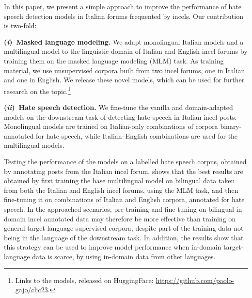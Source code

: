 \documentclass[11pt]{article}
\newcommand{\Ni}{({\em i})~}
\newcommand{\Nii}{({\em ii})~}
\newcommand{\todoA}[1]{\todo[color=blue!40]{A: #1}}
\begin{document}
In this paper, we present a simple approach to improve the performance of hate speech detection models in Italian forums frequented by incels. Our contribution is two-fold:


\noindent\textbf{\Ni Masked language modeling.} We adapt monolingual Italian models and a multilingual model to the linguistic domain of Italian and English incel forums by training them on the masked language modeling (MLM) task.
As training material, we use unsupervised corpora built from two incel forums, one in Italian and one in English.
We release these novel models, which can be used for further research on the topic.\footnote{Links to the models, released on HuggingFace: \url{https://github.com/paolo-gajo/clic23}.}

\noindent\textbf{\Nii Hate speech detection.}
We fine-tune the vanilla and domain-adapted models on the downstream task of detecting hate speech in Italian incel posts. %
Monolingual models are trained on Italian-only combinations of corpora binary-annotated for hate speech, while Italian--English combinations are used for the multilingual models.

Testing the performance of the models on a labelled hate speech corpus, obtained by annotating posts from the Italian incel forum, shows that the best results are obtained by first training the base multilingual model on bilingual data taken from both the Italian and English incel forums, using the MLM task, and then fine-tuning it on combinations of Italian and English corpora, annotated for hate speech. In the approached scenarios, pre-training and fine-tuning on bilingual in-domain incel annotated data may therefore be more effective than training on general target-language supervised corpora, despite part of the training data not being in the language of the downstream task. In addition, the results show that this strategy can be used to improve model performance when in-domain target-language data is scarce, by using in-domain data from other languages.
\end{document}
